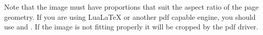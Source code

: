 \begin{teX}
\newpage
\mbox{}

\newpage
\end{teX}

Note that the image must have proportions that suit the aspect ratio of the page geometry. If you are using
LuaLaTeX or another pdf capable engine, you should use \CMDI{\pdfpagewidth} and \CMDI{\pdfpageheight}. If
the image is not fitting properly it will be cropped by the pdf driver. 


